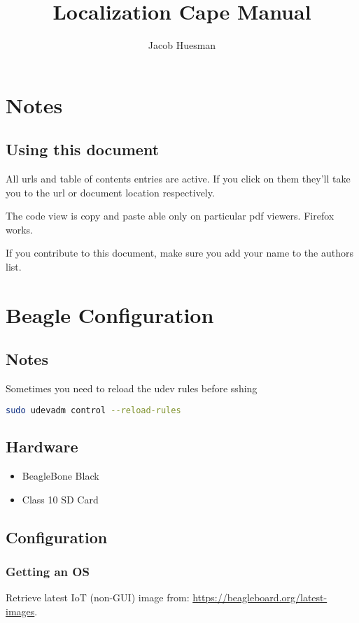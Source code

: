 \documentclass[]{book}
\title{Localization Cape Manual}
\author{Jacob Huesman}
\begin{document}
\let\cleardoublepage\clearpage
\maketitle
\tableofcontents


\chapter{Notes}
\section{Using this document}
All urls and table of contents entries are active. If you click on them they'll take you to the url or document location respectively.

The code view is copy and paste able only on particular pdf viewers. Firefox works.

If you contribute to this document, make sure you add your name to the authors list.


\chapter{Beagle Configuration}
\section{Notes}
Sometimes you need to reload the udev rules before sshing
\begin{lstlisting}[language=bash]
sudo udevadm control --reload-rules
\end{lstlisting}


\section{Hardware}
\begin{itemize}%
	\item BeagleBone Black
	\item Class 10 SD Card
\end{itemize}


\section{Configuration}
\subsection{Getting an OS}
Retrieve latest IoT (non-GUI) image from: \url{https://beagleboard.org/latest-images}.
\end{document}

